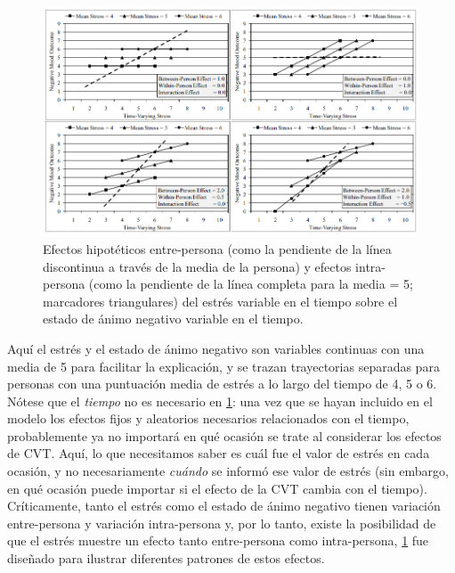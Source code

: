 \documentclass[spanish]{article}
\numberwithin{figure}{subsection}
\numberwithin{equation}{subsection}
\numberwithin{table}{subsection}
\begin{document}
\begin{figure}
	\centering
	\includegraphics{img/lessa1.png}
	\caption{Efectos hipotéticos entre-persona (como la pendiente de la línea
	discontinua a través de la media de la persona) y efectos intra-persona
	(como la pendiente de la línea completa para la media = 5; marcadores
	triangulares) del estrés variable en el tiempo sobre el estado de ánimo
	negativo variable en el tiempo.}
	\label{lessa_1}
\end{figure}

Aquí el estrés y el estado de ánimo negativo son variables continuas con una
media de 5 para facilitar la explicación, y se trazan trayectorias separadas
para personas con una puntuación media de estrés a lo largo del tiempo de 4, 5
o 6. Nótese que el \textit{tiempo} no es necesario en \ref{lessa_1}: una vez
que se hayan incluido en el modelo los efectos fijos y aleatorios necesarios
relacionados con el tiempo, probablemente ya no importará en qué ocasión se
trate al considerar los efectos de CVT. Aquí, lo que necesitamos saber es cuál
fue el valor de estrés en cada ocasión, y no necesariamente \textit{cuándo} se
informó ese valor de estrés (sin embargo, en qué ocasión puede importar si el
efecto de la CVT cambia con el tiempo). Críticamente, tanto el estrés como el
estado de ánimo negativo tienen variación entre-persona y variación
intra-persona y, por lo tanto, existe la posibilidad de que el estrés muestre
un efecto tanto entre-persona como intra-persona, \ref{lessa_1} fue diseñado
para ilustrar diferentes patrones de estos efectos.
\end{document}
